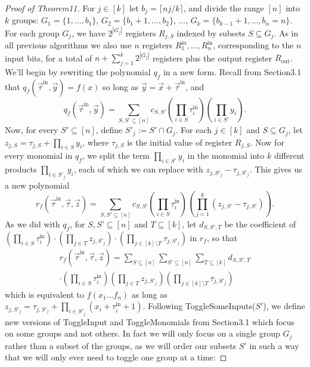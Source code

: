 \begin{proof}[Proof of Theorem11]
For $j\in[k]$ let $b_j=\lceil nj/k\rceil$, and divide the range $[n]$ into $k$ groups: $G_1=\{1,\ldots,b_1\}$, $G_2=\{b_1+1,\ldots,b_2\}$, $\ldots$, $G_k=\{b_{k-1}+1,\ldots,b_n=n\}$. For each group $G_j$, we have $2^{|G_j|}$ registers $R_{j,S}$ indexed by subsets $S\subseteq G_j$. As in all previous algorithms we also use $n$ registers $R_1^{\mathrm{in}},\ldots,R_n^{\mathrm{in}}$, corresponding to the $n$ input bits, for a total of $n+\sum_{j=1}^k2^{|G_j|}$ registers plus the output register $R_{\mathrm{out}}$.
We'll begin by rewriting the polynomial $q_f$ in a new form. Recall from Section3.1 that $q_f(\vec\tau^{\mathrm{in}},\vec y)=f(x)$ so long as $\vec y=\vec x+\vec\tau^{\mathrm{in}}$, and
\[q_f(\vec\tau^{\mathrm{in}},\vec y)=\sum_{S,S'\subseteq[n]}c_{S,S'}\left(\prod_{i\in S}\tau_i^{\mathrm{in}}\right)\left(\prod_{i\in S'}y_i\right).\]
Now, for every $S'\subseteq[n]$, define $S'_j:=S'\cap G_j$. For each $j\in[k]$ and $S\subseteq G_j$, let $z_{j,S}=\tau_{j,S}+\prod_{i\in S}y_i$, where $\tau_{j,S}$ is the initial value of register $R_{j,S}$. Now for every monomial in $q_f$, we split the term $\prod_{i\in S'}y_i$ in the monomial into $k$ different products $\prod_{i\in S'_j}y_i$, each of which we can replace with $z_{j,S'_j}-\tau_{j,S'_j}$. This gives us a new polynomial
\[r_f(\vec\tau^{\mathrm{in}},\vec\tau,\vec z)=\sum_{S,S'\subseteq[n]}c_{S,S'}\left(\prod_{i\in S}\tau_i^{\mathrm{in}}\right)\left(\prod_{j=1}^k(z_{j,S'}-\tau_{j,S'})\right).\]
As we did with $q_f$, for $S,S'\subseteq[n]$ and $T\subseteq[k]$, let $d_{S,S',T}$ be the coefficient of $(\prod_{i\in S}\tau_i^{\mathrm{in}})\cdot(\prod_{j\in T}z_{j,S'_j})\cdot(\prod_{j\in[k]\setminus T}\tau_{j,S'_j})$ in $r_f$, so that
\begin{multline*}
r_f(\vec\tau^{\mathrm{in}},\vec\tau,\vec z)=\sum_{S\subseteq[n]}\sum_{S'\subseteq[n]}\sum_{T\subseteq[k]}d_{S,S',T}\\
\cdot\left(\prod_{i\in S}\tau_i^{\mathrm{in}}\right)\left(\prod_{j\in T}z_{j,S'_j}\right)\left(\prod_{j\in[k]\setminus T}\tau_{j,S'_j}\right)
\end{multline*}
which is equivalent to $f(x_1\ldots f_n)$ as long as $z_{j,S'_j}=\tau_{j,S'_j}+\prod_{i\in S'_j}(x_i+\tau_i^{\mathrm{in}}+1)$.
Following ToggleSomeInputs($S'$), we define new versions of ToggleInput and ToggleMonomials from Section3.1 which focus on some groups and not others. In fact we will only focus on a single group $G_j$ rather than a subset of the groups, as we will order our subsets $S'$ in such a way that we will only ever need to toggle one group at a time:

\end{proof}
